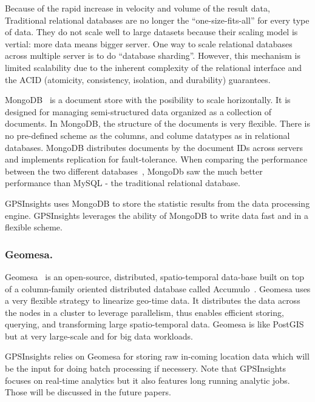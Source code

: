 \documentclass{acm_proc_article-sp}
\begin{document}
Because of the rapid increase in velocity and volume of the result data, Traditional relational databases are no longer the ``one-size-fits-all'' for every type of data. They do not scale well to large datasets because their scaling model is vertial: more data means bigger server. One way to scale relational databases across multiple server is to do ``database sharding''. However, this mechanism is limited scalability due to the inherent complexity of the relational interface and the ACID (atomicity, consistency, isolation, and durability) guarantees. 

MongoDB~\cite{mongodbweb} is a document store with the posibility to scale horizontally. It is designed for managing semi-structured data organized as a collection of documents. In MongoDB, the structure of the documents is very flexible. There is no pre-defined scheme as the columns, and colume datatypes as in relational databases. MongoDB distributes documents by the document IDs across servers and implements replication for fault-tolerance. When comparing the performance between the two different databases~\cite{10.11648/j.ajsea.20150402.12}, MongoDb saw the much better performance than MySQL - the traditional relational database.

GPSInsights uses MongoDB to store the statistic results from the data processing engine. GPSInsights leverages the ability of MongoDB to write data fast and in a flexible scheme. 

\subsubsection{Geomesa.}
 
Geomesa~\cite{fox2013spatio} is an open-source, distributed, spatio-temporal data-base built on top of a column-family oriented distributed database called Accumulo~\cite{accumuloonline}. Geomesa uses a very flexible strategy to linearize geo-time data. It distributes the data across the nodes in a cluster to leverage parallelism, thus enables efficient storing, querying, and transforming large spatio-temporal data. Geomesa is like PostGIS~\cite{posgis} but at very large-scale and for big data workloads. 

GPSInsights relies on Geomesa for storing raw in-coming location data which will be the input for doing batch processing if necessery. Note that GPSInsights focuses on real-time analytics but it also features long running analytic jobs. Those will be discussed in the future papers. 
\end{document}
